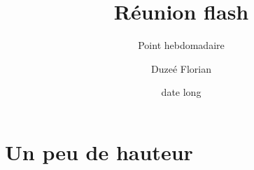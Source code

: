 \documentclass[A4,svgnames,9pt,aspectratio=169]{beamer}
\title[titrecourt]{Réunion flash}
\subtitle{Point hebdomadaire}
\date[30/04/2025]{date long}
\author[Duzes Florian]{Duzeé Florian}
\begin{document}

\frame{\titlepage}


\renewcommand{\contentsname}{Sommaire}

\frame{\tocpage}


 
\section{Un peu de hauteur}
\frame{\sectionpage}
\end{document}
